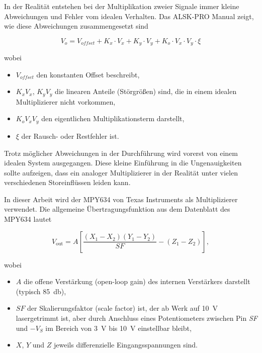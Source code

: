 \documentclass[../main.tex]{subfiles}
\begin{document}
\medskip
In der Realität entstehen bei der Multiplikation zweier Signale immer kleine Abweichungen und Fehler vom idealen Verhalten. Das ALSK-PRO Manual zeigt, wie diese Abweichungen zusammengesetzt sind\par

\begin{equation*}
V_o = V_{offset} + K_x \cdot V_x + K_y \cdot V_y + K_o \cdot V_x \cdot V_y \cdot \xi
\end{equation*}

wobei
\begin{itemize}
  \item $V_{offset}$ den konstanten Offset beschreibt,
  \item $K_x V_x$, $K_y V_y$ die linearen Anteile (Störgrößen) sind, die in einem idealen Multiplizierer nicht vorkommen,
  \item $K_o V_x V_y$ den eigentlichen Multiplikationsterm darstellt,
  \item $\xi$ der Rausch- oder Restfehler ist.
\end{itemize}

Trotz möglicher Abweichungen in der Durchführung wird vorerst von einem idealen System ausgegangen. Diese kleine Einführung in die Ungenauigkeiten sollte aufzeigen, dass ein analoger Multiplizierer in der Realität unter vielen verschiedenen Storeinflüssen leiden kann. \par
\medskip

In dieser Arbeit wird der MPY634 von Texas Instruments als Multiplizierer verwendet. Die allgemeine Übertragungsfunktion aus dem Datenblatt des MPY634 lautet 

\begin{equation}
  V_\text{out}
  = A \left[ \frac{(X_1 - X_2)(Y_1 - Y_2)}{SF} - (Z_1 - Z_2) \right],
  \label{eq:datasheet_multi1}
\end{equation}

wobei
\begin{itemize}
  \item $A$ die offene Verstärkung (open-loop gain) des internen Verstärkers darstellt (typisch \SI{85}{\decibel}),
  \item $SF$ der Skalierungsfaktor (scale factor) ist, der ab Werk auf \SI{10}{\volt} lasergetrimmt ist, aber durch Anschluss eines Potentiometers zwischen Pin \emph{SF} und $-V_{S}$ im Bereich von \SI{3}{\volt} bis \SI{10}{\volt} einstellbar bleibt,
  \item $X$, $Y$ und $Z$ jeweils differenzielle Eingangsspannungen sind.
\end{itemize}
\end{document}
